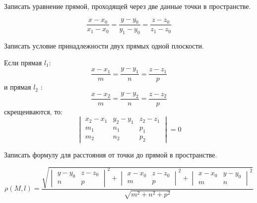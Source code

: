 \begin{question}
  Записать уравнение прямой, проходящей через две данные точки в пространстве.
\end{question}
\begin{answer}
  \[
    \frac{x - x_0}{x_1 - x_0} = \frac{y - y_0}{y_1 - y_0} = \frac{z - z_0}{z_1 - z_0}
  \] 
\end{answer}

\begin{question}
  Записать условие принадлежности двух прямых одной плоскости.
\end{question}
\begin{answer}
  Если прямая $l_1$: \[
    \frac{x - x_1}{m} = \frac{y - y_1}{n} = \frac{z - z_1}{p} 
  \] 
  и прямая $l_2$ : \[
    \frac{x - x_2}{m} = \frac{y - y_2}{n} = \frac{z - z_2}{p} 
  \] 
  скрещеиваются, то: \[
    \begin{vmatrix}
      x_2 - x_1 & y_2 - y_1 & z_2 - z_1 \\
      m_1 & n_1 & p_1 \\
      m_2 & n_2 & p_2
    \end{vmatrix} = 0
  \]
\end{answer}

\begin{question}
  Записать формулу для расстояния от точки до прямой в пространстве.
\end{question}
\begin{answer}
  \[
  \rho(M, l) = 
  \frac{\sqrt{
  \begin{vmatrix}
    y- y_0 & z - z_0 \\
    n & p
  \end{vmatrix}^2 +
  \begin{vmatrix}
    x - x_0 & z - z_0 \\
    m & p
  \end{vmatrix}^2 +
  \begin{vmatrix}
    x - x_0 & y - y_0 \\
    m & n
  \end{vmatrix}^2
  }}{\sqrt{m^2 + n^2 + p^2}} 
  \] 
\end{answer}


